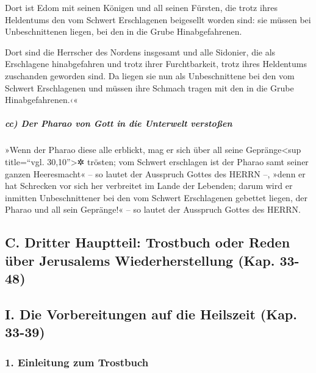 Dort ist Edom mit seinen Königen und all seinen Fürsten,
die trotz ihres Heldentums den vom Schwert Erschlagenen beigesellt
worden sind: sie müssen bei Unbeschnittenen liegen, bei den in die Grube
Hinabgefahrenen.

Dort sind die Herrscher des Nordens insgesamt und alle
Sidonier, die als Erschlagene hinabgefahren und trotz ihrer
Furchtbarkeit, trotz ihres Heldentums zuschanden geworden sind. Da
liegen sie nun als Unbeschnittene bei den vom Schwert Erschlagenen und
müssen ihre Schmach tragen mit den in die Grube Hinabgefahrenen.‹«

\hypertarget{cc-der-pharao-von-gott-in-die-unterwelt-verstouxdfen}{%
\subparagraph{cc) Der Pharao von Gott in die Unterwelt
verstoßen}\label{cc-der-pharao-von-gott-in-die-unterwelt-verstouxdfen}}

»Wenn der Pharao diese alle erblickt, mag er sich über
all seine Gepränge\textless sup title=``vgl. 30,10''\textgreater✲
trösten; vom Schwert erschlagen ist der Pharao samt seiner ganzen
Heeresmacht« -- so lautet der Ausspruch Gottes des HERRN --,
»denn er hat Schrecken vor sich her verbreitet im Lande
der Lebenden; darum wird er inmitten Unbeschnittener bei den vom Schwert
Erschlagenen gebettet liegen, der Pharao und all sein Gepränge!« -- so
lautet der Ausspruch Gottes des HERRN.

\hypertarget{c.-dritter-hauptteil-trostbuch-oder-reden-uxfcber-jerusalems-wiederherstellung-kap.-33-48}{%
\subsection{C. Dritter Hauptteil: Trostbuch oder Reden über Jerusalems
Wiederherstellung (Kap.
33-48)}\label{c.-dritter-hauptteil-trostbuch-oder-reden-uxfcber-jerusalems-wiederherstellung-kap.-33-48}}

\hypertarget{i.-die-vorbereitungen-auf-die-heilszeit-kap.-33-39}{%
\subsection{I. Die Vorbereitungen auf die Heilszeit (Kap.
33-39)}\label{i.-die-vorbereitungen-auf-die-heilszeit-kap.-33-39}}

\hypertarget{einleitung-zum-trostbuch}{%
\subsubsection{1. Einleitung zum
Trostbuch}\label{einleitung-zum-trostbuch}}


